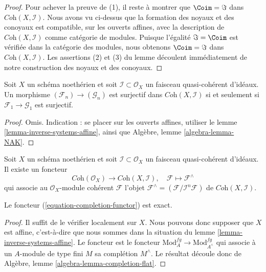 \begin{proof}
\medskip\noindent
Pour achever la preuve de (1), il reste à montrer que $\Coim = \Im$
dans $\textit{Coh}(X, \mathcal{I})$. Nous avons vu ci-dessus que la formation des
noyaux et des conoyaux est compatible, sur les ouverts affines, avec la description
de $\textit{Coh}(X, \mathcal{I})$ comme catégorie de modules. Puisque l'égalité
$\Im = \Coim$ est vérifiée dans la catégorie des modules,
nous obtenons $\Coim = \Im$ dans $\textit{Coh}(X, \mathcal{I})$.
Les assertions (2) et (3) du lemme découlent immédiatement de notre construction des
noyaux et des conoyaux.
\end{proof}

\begin{lemma}
\label{lemma-inverse-systems-surjective}
Soit $X$ un schéma noethérien et soit $\mathcal{I} \subset \mathcal{O}_X$
un faisceau quasi-cohérent d'idéaux. Un morphisme
$(\mathcal{F}_n) \to (\mathcal{G}_n)$ est surjectif dans
$\textit{Coh}(X, \mathcal{I})$
si et seulement si $\mathcal{F}_1 \to \mathcal{G}_1$ est surjectif.
\end{lemma}

\begin{proof}
Omis. Indication : se placer sur les ouverts affines, utiliser
le lemme \ref{lemma-inverse-systems-affine}, ainsi que
Algèbre, lemme \ref{algebra-lemma-NAK}.
\end{proof}

\noindent
Soit $X$ un schéma noethérien et soit $\mathcal{I} \subset \mathcal{O}_X$
un faisceau quasi-cohérent d'idéaux. Il existe un foncteur
\begin{equation}
\label{equation-completion-functor}
\textit{Coh}(\mathcal{O}_X) \longrightarrow \textit{Coh}(X, \mathcal{I}), \quad
\mathcal{F} \longmapsto \mathcal{F}^\wedge
\end{equation}
qui associe au $\mathcal{O}_X$-module cohérent $\mathcal{F}$
l'objet $\mathcal{F}^\wedge = (\mathcal{F}/\mathcal{I}^n\mathcal{F})$
de $\textit{Coh}(X, \mathcal{I})$.

\begin{lemma}
\label{lemma-exact}
Le foncteur (\ref{equation-completion-functor}) est exact.
\end{lemma}

\begin{proof}
Il suffit de le vérifier localement sur $X$. Nous pouvons donc supposer que $X$ est
affine, c'est-à-dire que nous sommes dans la situation du
lemme \ref{lemma-inverse-systems-affine}.
Le foncteur est le foncteur $\text{Mod}^{fg}_A \to \text{Mod}^{fg}_{A^\wedge}$
qui associe à un $A$-module de type fini $M$ sa complétion $M^\wedge$.
Le résultat découle donc de
Algèbre, lemme \ref{algebra-lemma-completion-flat}.
\end{proof}

